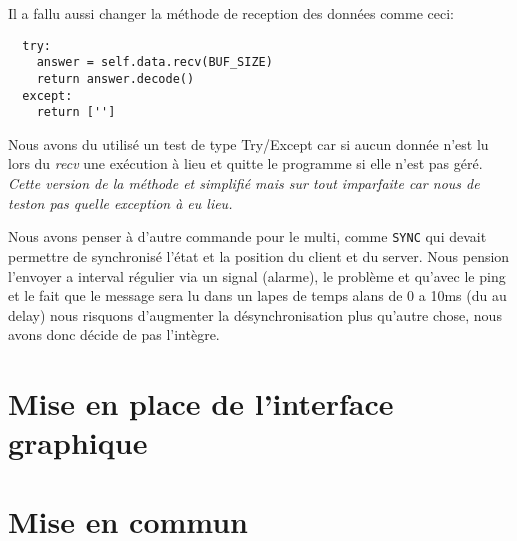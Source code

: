 \documentclass[12pt]{report}
\begin{document}
Il a fallu aussi changer la méthode de reception des données comme ceci:
\begin{verbatim}
  try:
    answer = self.data.recv(BUF_SIZE)
    return answer.decode()
  except:
    return ['']
\end{verbatim}

Nous avons du utilisé un test de type Try/Except car si aucun donnée n'est lu
lors du \textit{recv} une exécution à lieu et quitte le programme si elle
n'est pas géré.
\textit{Cette version de la méthode et simplifié mais sur tout imparfaite
  car nous de teston pas quelle exception à eu lieu.}

Nous avons penser à d'autre commande pour le multi, comme \texttt{SYNC} qui
devait permettre de synchronisé l'état et la position du client et du server.
Nous pension l'envoyer a interval régulier via un signal  (alarme),
le problème et qu'avec le ping et le fait que le message sera lu dans un lapes
de temps alans de 0 a 10ms (du au delay) nous risquons d'augmenter la
désynchronisation plus qu'autre chose, nous avons donc décide de pas l'intègre.

\chapter{Mise en place de l'interface graphique}

\chapter{Mise en commun}
\end{document}
